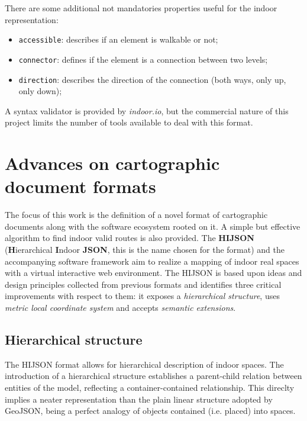 \documentclass{sig-alternate}
\begin{document}
There are some additional not mandatories properties useful for
the indoor representation:

\begin{itemize}
\itemsep1pt\parskip0pt
\item
  \texttt{accessible}: describes if an element is walkable or not;
\item
  \texttt{connector}: defines if the element is a connection between two
  levels;
\item
  \texttt{direction}: describes the direction of the connection (both
  ways, only up, only down);
\end{itemize}

A syntax validator is provided by \emph{indoor.io}, but the commercial nature of 
this project limits the number of tools available to deal with this format.

\section{Advances on cartographic document formats}\label{advances-on-cartographic-document-format}

The focus of this work is the definition of a novel format of cartographic 
documents along with the software ecosystem rooted on it. A simple but effective 
algorithm to find indoor valid routes is also provided.
The \textbf{HIJSON} (\textbf{H}ierarchical \textbf{I}ndoor \textbf{JSON}, this is the 
name chosen for the format) and the accompanying software framework aim to realize 
a mapping of indoor real spaces with a virtual interactive web environment.
The HIJSON is based upon ideas and design principles collected 
from previous formats and identifies three critical 
improvements with respect to them: it exposes a \emph{hierarchical structure}, 
uses \emph{metric local coordinate system} and accepts \emph{semantic extensions}.

\subsection{Hierarchical structure}\label{hierarchical-structure}

The HIJSON format allows for hierarchical description of indoor spaces. 
The introduction of a hierarchical structure establishes a parent-child relation 
between entities of the model, reflecting a container-contained relationship. 
This direclty implies a neater representation than the plain linear structure adopted 
by GeoJSON, being a perfect analogy of objects contained (i.e. placed) into spaces.
\end{document}
